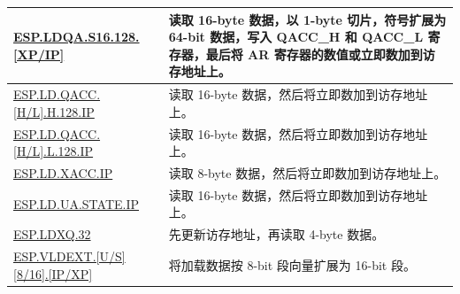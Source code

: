 \begin{longtable}[c]{|l|m{12cm}|}
\hyperref[instruction:ESPLDQAS16128XP]{ESP.LDQA.S16.128.[XP/IP]} & 读取 16-byte 数据，以 1-byte 切片，符号扩展为 64-bit 数据，写入 QACC\_H 和 QACC\_L 寄存器，最后将 AR 寄存器的数值或立即数加到访存地址上。\\\hline
\hyperref[instruction:ESPLDQACC_HH128IP]{ESP.LD.QACC.[H/L].H.128.IP} & 读取 16-byte 数据，然后将立即数加到访存地址上。\\\hline
\hyperref[instruction:ESPLDQACC_HL128IP]{ESP.LD.QACC.[H/L].L.128.IP} & 读取 16-byte 数据，然后将立即数加到访存地址上。\\\hline
\hyperref[instruction:ESPLDXACCIP]{ESP.LD.XACC.IP} & 读取 8-byte 数据，然后将立即数加到访存地址上。\\\hline
\hyperref[instruction:ESPLDUA_STATEIP]{ESP.LD.UA.STATE.IP} & 读取 16-byte 数据，然后将立即数加到访存地址上。\\\hline
\hyperref[instruction:ESPLDXQ32]{ESP.LDXQ.32} & 先更新访存地址，再读取 4-byte 数据。\\\hline
\hyperref[instruction:ESPVLDEXTU8IP]{ESP.VLDEXT.[U/S][8/16].[IP/XP]} & 将加载数据按 8-bit 段向量扩展为 16-bit 段。\\\hline


\end{longtable}